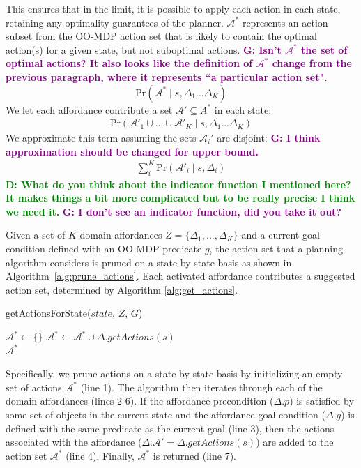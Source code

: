 \documentclass[conference]{IEEEtran}
\newcommand{\dnote}[1]{\textcolor{Green}{\textbf{D: #1}}}
\newcommand{\gnote}[1]{\textcolor{Purple}{\textbf{G: #1}}}
\begin{document}
This ensures that in the limit, it is possible to apply each action in each state, retaining
any optimality guarantees of the planner. $\mathcal{A}^*$ represents
an action subset from the OO-MDP action set that is likely to contain the optimal action(s) for a given state,
but not suboptimal actions. \gnote{Isn't $\mathcal{A}^*$ the set of optimal actions? It also looks like the definition of $\mathcal{A}^*$ change from the previous paragraph, where it represents ``a particular action set".}
\begin{equation}
\text{Pr}(\mathcal{A}^* \mid s, \Delta_1 \dots \Delta_K)
\end{equation}
We let each affordance contribute a set $\mathcal{A}' \subseteq A^*$ in each state:
\begin{align}
\text{Pr}(\mathcal{A}'_1 \cup \ldots \cup \mathcal{A}'_K \mid s, \Delta_1 \dots \Delta_K)
\end{align}
We approximate this term assuming the sets $\mathcal{A}_i'$ are disjoint:
\gnote{I think approximation should be changed for upper bound.}
\begin{align}
\sum_i^K \text{Pr}(\mathcal{A}'_i \mid s, \Delta_i)
\end{align}
\dnote{What do you think about the indicator function I mentioned here? It makes things a bit more complicated but to be really precise
I think we need it.} \gnote{I don't see an indicator function, did you take it out?}

Given a set of $K$ domain affordances $Z = \{\Delta_1, ..., \Delta_K\}$ and a current 
goal condition defined with an OO-MDP predicate $g$, the action set that a 
planning algorithm considers is pruned on a state by state basis as shown in 
Algorithm~\ref{alg:prune_actions}.  Each 
activated affordance contributes a suggested action set, determined by Algorithm \ref{alg:get_actions}. 

\begin{algorithm}
  \caption{getActionsForState($state$, $Z$, $G$)}
  \begin{algorithmic}[1]
    \State $\mathcal{A}^* \leftarrow \{\}$
    \State $\mathcal{A}^* \leftarrow \mathcal{A}^* \cup \Delta.getActions(s)$
    \EndIf
    \EndFor \\
    \Return $\mathcal{A}^*$
  \end{algorithmic}
  \label{alg:prune_actions}
\end{algorithm}

Specifically, we prune actions on a state by state basis
by initializing an empty set of actions $\mathcal{A}^*$ (line 1). The algorithm then iterates
through each of the domain affordances (lines 2-6). If the affordance
precondition ($\Delta.p$) is satisfied by some set of objects in the current state
and the affordance goal condition ($\Delta.g$) is defined with the same predicate
as the current goal (line 3), then the actions associated with the affordance ($\Delta.\mathcal{A}' = \Delta.getActions(s)$) are added to the action set $\mathcal{A}^*$ (line 4). Finally, $\mathcal{A}^*$ is returned (line 7).
\end{document}
